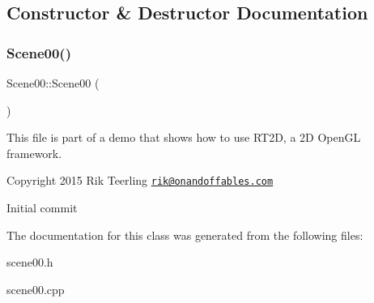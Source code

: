 \subsection{Constructor \& Destructor Documentation}
\mbox{\label{class_scene00_acf63b43edc4b904b0d94e7aa94cc2c3b}} 
\subsubsection{\texorpdfstring{Scene00()}{Scene00()}}
{\footnotesize\ttfamily Scene00\+::\+Scene00 (\begin{DoxyParamCaption}{ }\end{DoxyParamCaption})}

This file is part of a demo that shows how to use R\+T2D, a 2D Open\+GL framework.


\begin{DoxyItemize}
\item Copyright 2015 Rik Teerling \href{mailto:rik@onandoffables.com}{\tt rik@onandoffables.\+com}
\begin{DoxyItemize}
\item Initial commit 
\end{DoxyItemize}
\end{DoxyItemize}

The documentation for this class was generated from the following files\+:\begin{DoxyCompactItemize}
\item 
scene00.\+h\item 
scene00.\+cpp\end{DoxyCompactItemize}
